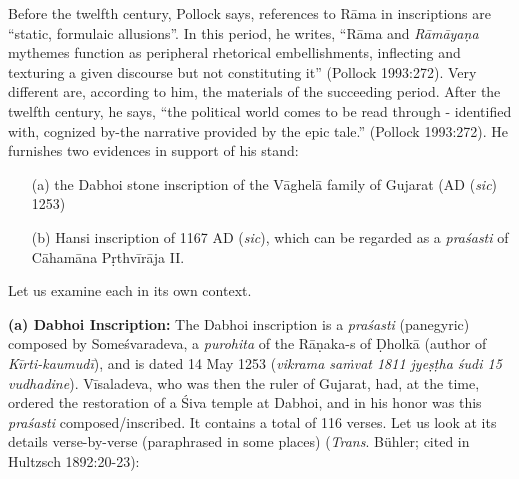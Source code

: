Before the twelfth century, Pollock says, references to Rāma in inscriptions are “static, formulaic allusions”. In this period, he writes, “Rāma and {\sl Rāmāyaṇa} mythemes function as peripheral rhetorical embellishments, inflecting and texturing a given discourse but not constituting it” (Pollock 1993:272). Very different are, according to him, the materials of the succeeding period. After the twelfth century, he says, “the political world comes to be read through - identified with, cognized by-the narrative provided by the epic tale.” (Pollock 1993:272). He furnishes two evidences in support of his stand: 
\begin{itemize}
\itemsep=0pt
\item[(a)] the Dabhoi stone inscription of the Vāghelā family of Gujarat (AD ({\sl sic}) 1253) 
\item[(b)] Hansi inscription of 1167 AD ({\sl sic}), which can be regarded as a {\sl praśasti} of Cāhamāna Pṛthvīrāja II. 
\end{itemize}
Let us examine each in its own context. 

\smallskip
\noindent
{\bf (a) Dabhoi Inscription:} The Dabhoi inscription is a {\sl praśasti} (panegyric) composed by Someśvaradeva, a {\sl purohita} of the Rāṇaka-s of Ḍholkā (author of {\sl Kīrti-kaumudī}), and is dated 14 May 1253 ({\sl vikrama saṁvat 1811 jyeṣṭha śudi 15 vudhadine}). Vīsaladeva, who was then the ruler of Gujarat, had, at the time, ordered the restoration of a Śiva temple at Dabhoi, and in his honor was this {\sl praśasti} composed/inscribed. It contains a total of 116 verses. Let us look at its details verse-by-verse (paraphrased in some places) ({\sl Trans}. Bühler; cited in Hultzsch 1892:20-23):

